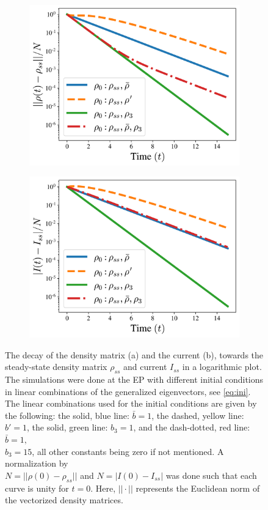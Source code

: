 \documentclass[../main.tex]{subfiles}
\begin{document}
\begin{figure}[H]
\centering
\begin{subfigure}[t]{.5\textwidth}
  \centering
  \includegraphics[width=\linewidth]{figures/rho_diff_rho0_v4.png}
  \caption{}
  \label{fig:rhodiffrho0}
\end{subfigure}%
\begin{subfigure}[t]{.5\textwidth}
  \centering
  \includegraphics[width=\linewidth]{figures/I_diff_rho0_nonvis.png}
  \caption{}
  \label{fig:Idiffrho0}
\end{subfigure}
\caption{The decay of the density matrix (a) and the current (b), towards the steady-state density matrix $\rho_{ss}$ and current $I_{ss}$ in a logarithmic plot. The simulations were done at the EP with different initial conditions in linear combinations of the generalized eigenvectors, see \cref{eq:ini}. The linear combinations used for the initial conditions are given by the following: the solid, blue line: $\bar b = 1$, the dashed, yellow line: $b'=1$, the solid, green line: $b_3=1$, and the dash-dotted, red line: $\bar b=1,$ \\{$b_3=15$}, all other constants being zero if not mentioned. A normalization by \\{$N=||\rho(0) - \rho_{ss}||$} and $N=|I(0) - I_{ss}|$ was done such that each curve is unity for $t=0$. Here, $||\cdot||$ represents the Euclidean norm of the vectorized density matrices.}

\end{figure}
\end{document}
